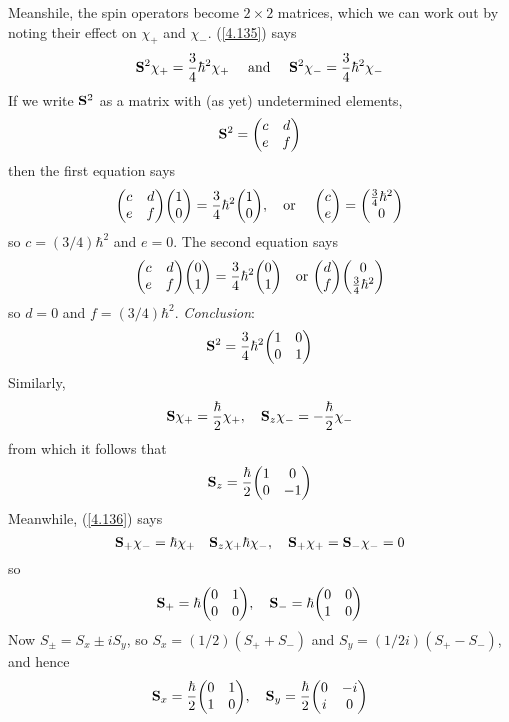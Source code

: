 Meanshile, the spin operators become $2\times 2$ matrices, which we can work out by noting their effect on $\chi_+$ and $\chi_-$. (\ref{4.135}) says
\begin{equation}\label{4.142}
	\vb{S}^2\chi_+=\frac{3}{4}\hbar^2\chi_+\quad\mbox{ and  }\quad \vb{S}^2\chi_-=\frac{3}{4}\hbar^2\chi_-
\end{equation}
If we write $\vb{S}^2$ as a matrix with (as yet) undetermined elements, $$\vb{S}^2=\mqty(c&d\\e&f)$$ then the first equation says $$\mqty(c&d\\e&f)\mqty(1\\0)=\frac{3}{4}\hbar^2\mqty(1\\0),\quad \mbox{or }\quad \mqty(c\\e)=\mqty(\frac{3}{4}\hbar^2\\0)$$ so $c=(3/4)\hbar^2$ and $e=0$. The second equation says $$\mqty(c&d\\e&f)\mqty(0\\1)=\frac{3}{4}\hbar^2\mqty(0\\1)\quad\mbox{or }\mqty(d\\f)\mqty(0\\\frac{3}{4}\hbar^2)$$ so $d=0$ and $f=(3/4)\hbar^2$. \textit{Conclusion}:
\begin{equation}\label{4.143}
	\vb{S}^2=\frac{3}{4}\hbar^2\mqty(1&0\\0&1)
\end{equation}
Similarly,
\begin{equation}\label{4.144}
	\vb{S}\chi_+=\frac{\hbar}{2}\chi_+,\quad \vb{S}_z\chi_-=-\frac{\hbar}{2}\chi_-
\end{equation}
from which it follows that
\begin{equation}\label{4.145}
	\vb{S}_z=\frac{\hbar}{2}\mqty(1&0\\0&-1)
\end{equation}
Meanwhile, (\ref{4.136}) says $$\vb{S}_+\chi_-=\hbar\chi_+\quad \vb{S}_z\chi_+\hbar\chi_-,\quad \vb{S}_+\chi_+=\vb{S}_-\chi_-=0$$ so 
\begin{equation}\label{1.146}
	\vb{S}_+=\hbar\mqty(0&1\\0&0),\quad \vb{S}_-=\hbar\mqty(0&0\\1&0)
\end{equation}
Now $S_{\pm}=S_x\pm iS_y$, so $S_x=(1/2)(S_+ + S_-)$ and $S_y=(1/2i)(S_+-S_-)$, and hence
\begin{equation}\label{4.147}
	\vb{S}_x=\frac{\hbar}{2}\mqty(0&1\\1&0),\quad \vb{S}_y=\frac{\hbar}{2}\mqty(0&-i\\i&0)
\end{equation}
